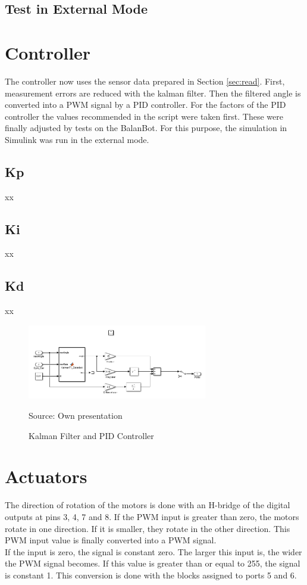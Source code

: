 	\subsection{Test in External Mode}
	

\section{Controller}
The controller now uses the sensor data prepared in Section \ref{sec:read}. First, measurement errors are reduced with the kalman filter.
Then the filtered angle is converted into a PWM signal by a PID controller.
For the factors of the PID controller the values recommended in the script were taken first. These were finally adjusted by tests on the BalanBot. For this purpose, the simulation in Simulink was run in the external mode.\\

	\subsection{Kp}
	xx
	\subsection{Ki}
	xx
	\subsection{Kd}
	xx
	
	\begin{figure}[H]
		\centering
		\includegraphics[width=0.7\textwidth]{figures/controller.PNG}
		\caption{Kalman Filter and PID Controller}	
		Source: Own presentation	
		\label{fig:controller}	
	\end{figure}


\section{Actuators}
The direction of rotation of the motors is done with an H-bridge of the digital outputs at pins 3, 4, 7 and 8. If the PWM input is greater than zero, the motors rotate in one direction. If it is smaller, they rotate in the other direction.
This PWM input value is finally converted into a PWM signal.\\
If the input is zero, the signal is constant zero. The larger this input is, the wider the PWM signal becomes. If this value is greater than or equal to 255, the signal is constant 1. This conversion is done with the blocks assigned to ports 5 and 6.

